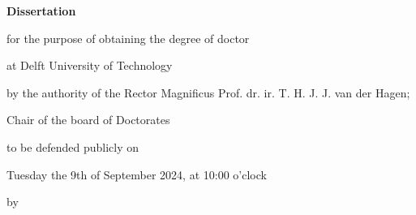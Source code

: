 \begin{titlepage}

\begin{center}

\vspace*{2\bigskipamount}

{\makeatletter
\titlestyle\bfseries\LARGE\@title
\makeatother}

{\makeatletter
\ifx\@subtitle\undefined\else
    \bigskip
    \titlefont\titleshape\Large\@subtitle
\fi
\makeatother}

\end{center}

\cleardoublepage
\thispagestyle{empty}

\begin{center}


\vspace*{2\bigskipamount}

{\makeatletter
\titlestyle\bfseries\LARGE\@title
\makeatother}

{\makeatletter
\ifx\@subtitle\undefined\else
    \bigskip
    \titlefont\titleshape\Large\@subtitle
\fi
\makeatother}

\vfill


{\Large\titlefont\bfseries Dissertation}

\bigskip
\bigskip

for the purpose of obtaining the degree of doctor

at Delft University of Technology

by the authority of the Rector Magnificus Prof. dr. ir. T. H. J. J. van der Hagen;

Chair of the board of Doctorates

to be defended publicly on

Tuesday the 9th of September 2024, at 10:00 o’clock

\bigskip
\bigskip

by

\bigskip
\bigskip

\makeatletter
{\Large\titlefont\bfseries\@firstname\ {\titleshape\@lastname}}
\makeatother


\end{center}
\end{titlepage}
